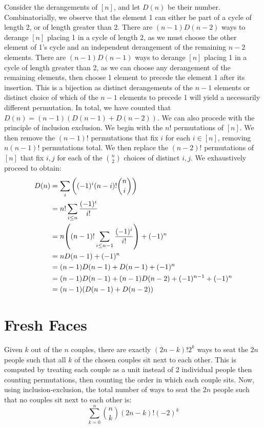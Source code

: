 \documentclass{article}
\begin{document}
Consider the derangements of $[n]$, and let $D(n)$ be their number. Combinatorially, we observe that the element 1 can either be part of a cycle of length 2, or of length greater than 2. There are $(n-1)D(n-2)$ ways to derange $[n]$ placing 1 in a cycle of length 2, as we must choose the other element of 1's cycle and an independent derangement of the remaining $n-2$ elements. There are $(n-1)D(n-1)$ ways to derange $[n]$ placing 1 in a cycle of length greater than 2, as we can choose any derangement of the remaining elements, then choose 1 element to precede the element 1 after its insertion. This is a bijection as distinct derangements of the $n-1$ elements or distinct choice of which of the $n-1$ elements to precede 1 will yield a necessarily different permutation. In total, we have counted that $D(n) = (n-1)(D(n-1) + D(n-2))$. We can also procede with the principle of inclusion exclusion. We begin with the $n!$ permutations of $[n]$. We then remove the $(n-1)!$ permutations that fix $i$ for each $i \in [n]$, removing $n(n-1)!$ permutations total. We then replace the $(n-2)!$ permutations of $[n]$ that fix $i, j$ for each of the $\binom{n}{2}$ choices of distinct $i, j$. We exhaustively proceed to obtain:
\begin{align*}
D(n) &= \sum_i\qty((-1)^i(n-i)!\binom{n}{i}) \\
&= n!\sum_{i \le n}\frac{(-1)^i}{i!} \\
&= n\qty((n-1)!\sum_{i \le n-1}\frac{(-1)^i}{i!}) + (-1)^n \\
&= nD(n-1) + (-1)^n \\
&= (n-1)D(n-1) + D(n-1) + (-1)^n \\
&= (n-1)D(n-1) + (n-1)D(n-2) + (-1)^{n-1} + (-1)^n \\
&= (n-1)(D(n-1) + D(n-2))
\end{align*}
\section{Fresh Faces}

Given $k$ out of the $n$ couples, there are exactly $(2n - k)!2^k$ ways to seat the $2n$ people such that all $k$ of the chosen couples sit next to each other. This is computed by treating each couple as a unit instead of 2 individual people then counting permutations, then counting the order in which each couple sits. Now, using inclusion-exclusion, the total number of ways to seat the $2n$ people such that no couples sit next to each other is:
$$\sum_{k = 0}^n\binom{n}{k}(2n -k)!(-2)^k$$
\end{document}
